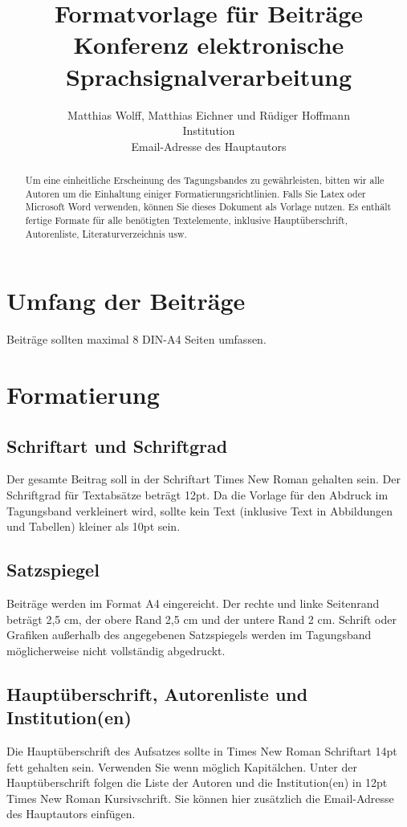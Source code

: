\documentclass[12pt,a4paper]{article}
\begin{document}
\title{
  Formatvorlage für Beiträge Konferenz elektronische Sprachsignalverarbeitung
}
\author{
  Matthias Wolff, Matthias Eichner und Rüdiger Hoffmann\\[6pt]
  Institution\\
  Email-Adresse des Hauptautors
}
\maketitle
\thispagestyle{empty}
\begin{abstract}
  Um eine einheitliche Erscheinung des Tagungsbandes zu gewährleisten, bitten wir alle Autoren 
  um die Einhaltung einiger Formatierungsrichtlinien. Falls Sie Latex oder Microsoft Word verwenden, 
  können Sie dieses Dokument als Vorlage nutzen. Es enthält fertige Formate für alle benötigten 
  Textelemente, inklusive Hauptüberschrift, Autorenliste, Literaturverzeichnis usw.
\end{abstract}

\section{Umfang der Beiträge}
Beiträge sollten maximal 8 DIN-A4 Seiten umfassen.

\section{Formatierung}
\subsection{Schriftart und Schriftgrad}
Der gesamte Beitrag soll in der Schriftart Times New Roman gehalten sein. Der Schriftgrad für 
Textabsätze beträgt 12pt. Da die Vorlage für den Abdruck im Tagungsband verkleinert wird, sollte 
kein Text (inklusive Text in Abbildungen und Tabellen) kleiner als 10pt sein. 

\subsection{Satzspiegel}
Beiträge werden im Format A4 eingereicht. Der rechte und linke Seitenrand beträgt 2,5 cm, der 
obere Rand 2,5 cm und der untere Rand 2 cm. Schrift oder Grafiken außerhalb des angegebenen 
Satzspiegels werden im Tagungsband möglicherweise nicht vollständig abgedruckt. 

\subsection{Hauptüberschrift, Autorenliste und Institution(en)}
Die Hauptüberschrift des Aufsatzes sollte in Times New Roman Schriftart 14pt fett gehalten sein. 
Verwenden Sie wenn möglich Kapitälchen. Unter der Hauptüberschrift folgen die Liste der Autoren 
und die Institution(en) in 12pt Times New Roman Kursivschrift. Sie können hier zusätzlich die 
Email-Adresse des Hauptautors einfügen. 
\end{document}
